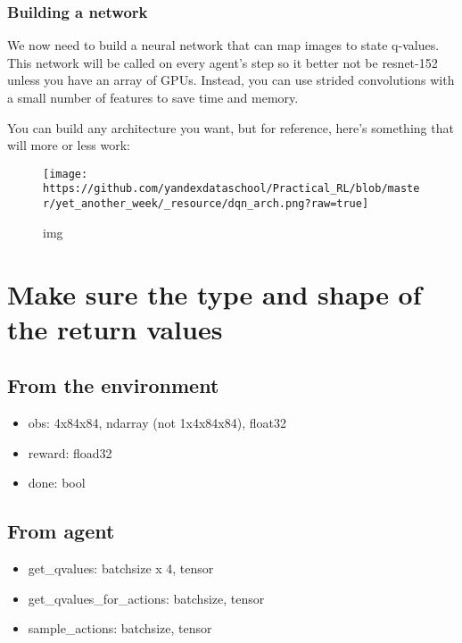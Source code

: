 \documentclass[11pt]{article}
\makeatletter
\def\maxwidth{\ifdim\Gin@nat@width>\linewidth\linewidth
    \else\Gin@nat@width\fi}
\let\Oldincludegraphics\includegraphics
\renewcommand{\includegraphics}[1]{\Oldincludegraphics[width=.8\maxwidth]{#1}}
\providecommand{\tightlist}{%
      \setlength{\itemsep}{0pt}\setlength{\parskip}{0pt}}
\makeatother
\begin{document}
    \hypertarget{building-a-network}{%
\subsubsection{Building a network}\label{building-a-network}}

We now need to build a neural network that can map images to state
q-values. This network will be called on every agent's step so it better
not be resnet-152 unless you have an array of GPUs. Instead, you can use
strided convolutions with a small number of features to save time and
memory.

You can build any architecture you want, but for reference, here's
something that will more or less work:

    \begin{figure}
\centering
\texttt{[image: https://github.com/yandexdataschool/Practical\_RL/blob/master/yet\_another\_week/\_resource/dqn\_arch.png?raw=true]}
\caption{img}
\end{figure}

    \hypertarget{make-sure-the-type-and-shape-of-the-return-values}{%
\section{Make sure the type and shape of the return
values}\label{make-sure-the-type-and-shape-of-the-return-values}}

\hypertarget{from-the-environment}{%
\subsection{From the environment}\label{from-the-environment}}

\begin{itemize}
\tightlist
\item
  obs: 4x84x84, ndarray (not 1x4x84x84), float32
\item
  reward: fload32
\item
  done: bool
\end{itemize}

\hypertarget{from-agent}{%
\subsection{From agent}\label{from-agent}}

\begin{itemize}
\tightlist
\item
  get\_qvalues: batchsize x 4, tensor
\item
  get\_qvalues\_for\_actions: batchsize, tensor
\item
  sample\_actions: batchsize, tensor
\end{itemize}
\end{document}
